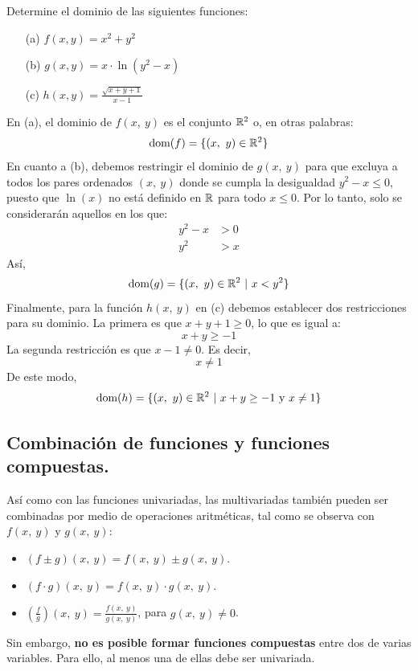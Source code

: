 \documentclass[12pt]{article}
\begin{document}
\ejemplo Determine el dominio de las siguientes funciones:

\begin{enumerate}
\item[(a)] $f(x, y) = x^{2} + y^{2}$
\item[(b)] $g(x, y) = x \cdot \ln(y^{2} - x)$
\item[(c)] $\displaystyle h(x, y) = \frac{\sqrt{x + y + 1}}{x - 1}$
\end{enumerate}

\solucion En (a), el dominio de $f(x, \ y)$ es el conjunto $\mathbb{R}^{2}$ o, en otras palabras:
\[
  \text{dom}(f) = \{(x, \ y) \in \mathbb{R}^{2}\}
\]
En cuanto a (b), debemos restringir el dominio de $g(x, \ y)$ para que excluya a todos los pares ordenados $(x, \ y)$ donde se cumpla la desigualdad $y^{2} - x \leq 0$, puesto que $\ln(x)$ no está definido en $\mathbb{R}$ para todo $x \leq 0$. Por lo tanto, solo se considerarán aquellos en los que:
\begin{align*}
y^{2} - x &> 0 \\
y^{2} &> x
\end{align*}
Así,
\[
  \text{dom}(g) = \{(x, \ y) \in \mathbb{R}^{2} \ | \ x < y^{2}\}
\]
Finalmente, para la función $h(x, \ y)$ en (c) debemos establecer dos restricciones para su dominio. La primera es que $x + y + 1 \geq 0$, lo que es igual a:
\[
  x + y \geq -1
\]
La segunda restricción es que $x - 1 \neq 0$. Es decir,
\[
  x \neq 1
\]
De este modo,
\[
  \text{dom}(h) = \{(x, \ y) \in \mathbb{R}^{2} \ | \ x + y \geq -1 \text{ y } x \neq 1\}
\]

\subsection{Combinación de funciones y funciones compuestas.}

Así como con las funciones univariadas, las multivariadas también pueden ser combinadas por medio de operaciones aritméticas, tal como se observa con $f(x, \ y)$ y $g(x, \ y)$:

\begin{itemize}
\item $(f \pm g)(x, \ y) = f(x, \ y) \pm g(x, \ y)$.
\item $(f \cdot g)(x, \ y) = f(x, \ y) \cdot g(x, \ y)$.
\item $\displaystyle \left(\frac{f}{g}\right)(x, \ y) = \frac{f(x, \ y)}{g(x, \ y)}$, para $g(x, \ y) \neq 0$.
\end{itemize}

Sin embargo, \textbf{no es posible formar funciones compuestas} entre dos de varias variables. Para ello, al menos una de ellas debe ser univariada.
\end{document}
